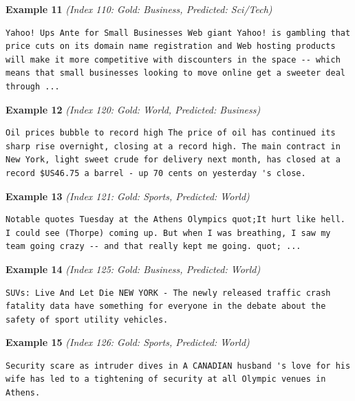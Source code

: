 \noindent
\textbf{Example 11} \quad \textit{(Index 110: Gold: Business, Predicted: Sci/Tech)}

\begin{Verbatim}[breaklines=true,breakanywhere=true,fontsize=\small]
Yahoo! Ups Ante for Small Businesses Web giant Yahoo! is gambling that price cuts on its domain name registration and Web hosting products will make it more competitive with discounters in the space -- which means that small businesses looking to move online get a sweeter deal through ...
\end{Verbatim}

\noindent
\textbf{Example 12} \quad \textit{(Index 120: Gold: World, Predicted: Business)}

\begin{Verbatim}[breaklines=true,breakanywhere=true,fontsize=\small]
Oil prices bubble to record high The price of oil has continued its sharp rise overnight, closing at a record high. The main contract in New York, light sweet crude for delivery next month, has closed at a record $US46.75 a barrel - up 70 cents on yesterday 's close.
\end{Verbatim}

\noindent
\textbf{Example 13} \quad \textit{(Index 121: Gold: Sports, Predicted: World)}

\begin{Verbatim}[breaklines=true,breakanywhere=true,fontsize=\small]
Notable quotes Tuesday at the Athens Olympics quot;It hurt like hell. I could see (Thorpe) coming up. But when I was breathing, I saw my team going crazy -- and that really kept me going. quot; ...
\end{Verbatim}

\noindent
\textbf{Example 14} \quad \textit{(Index 125: Gold: Business, Predicted: World)}

\begin{Verbatim}[breaklines=true,breakanywhere=true,fontsize=\small]
SUVs: Live And Let Die NEW YORK - The newly released traffic crash fatality data have something for everyone in the debate about the safety of sport utility vehicles.
\end{Verbatim}

\noindent
\textbf{Example 15} \quad \textit{(Index 126: Gold: Sports, Predicted: World)}

\begin{Verbatim}[breaklines=true,breakanywhere=true,fontsize=\small]
Security scare as intruder dives in A CANADIAN husband 's love for his wife has led to a tightening of security at all Olympic venues in Athens.
\end{Verbatim}

